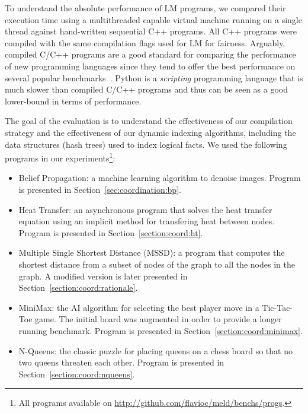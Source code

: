 To understand the absolute performance of LM programs, we compared their
execution time using a multithreaded capable virtual machine running on a single
thread against hand-written sequential C++ programs. All C++ programs were
compiled with the same compilation flags used for LM for fairness. Arguably,
compiled C/C++ programs are a good standard for comparing the performance of new
programming languages since they tend to offer the best performance on several
popular benchmarks~\cite{language_benchmarks}.  Python is a \emph{scripting}
programming language that is much slower than compiled C/C++ programs and thus
can be seen as a good lower-bound in terms of performance.

The goal of the evaluation is to understand the effectiveness of our compilation
strategy and the effectiveness of our dynamic indexing algorithms, including the
data structures (hash trees) used to index logical facts. We used the following
programs in our experiments\footnote{All programs available on
   \url{http://github.com/flavioc/meld/benchs/progs}.}:

\begin{itemize}
   \item Belief Propagation: a machine learning algorithm to denoise images. Program is
      presented in Section~\ref{sec:coordination:bp}.

   \item Heat Transfer: an asynchronous program that solves the heat transfer
      equation using an implicit method for transfering heat between nodes.
      Program is presented in Section~\ref{section:coord:ht}.

   \item Multiple Single Shortest Distance (MSSD): a program that computes the
      shortest distance from a subset of nodes of the graph to all the nodes in
      the graph. A modified version is later presented in
      Section~\ref{section:coord:rationale}.

    \item MiniMax: the AI algorithm for selecting the best player move in a
       Tic-Tac-Toe game. The initial board was augmented in order to provide a
       longer running benchmark. Program is presented in
       Section~\ref{section:coord:minimax}.


   \item N-Queens: the classic puzzle for placing queens on a chess board so
      that no two queens threaten each other. Program is presented in
      Section~\ref{section:coord:nqueens}.

\end{itemize}

